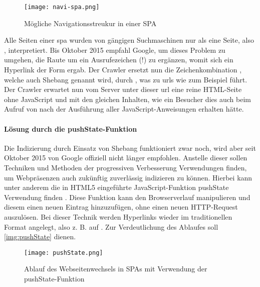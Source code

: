\begin{figure}[H]
	\begin{center}
		\texttt{[image: navi-spa.png]}
		\caption{Mögliche Navigationsstreukur in einer SPA}
		\label{img:navi-spa}
	\end{center}
\end{figure}

Alle Seiten einer \ac{spa} wurden von gängigen Suchmaschinen nur als eine Seite, also , interpretiert. Bis Oktober 2015 empfahl Google, um dieses Problem zu umgehen, die Raute um ein Ausrufezeichen (!) zu ergänzen, womit sich ein Hyperlink der Form  ergab. Der Crawler ersetzt nun die Zeichenkombination \quotes{\#!}, welche auch Shebang genannt wird, durch , was zu \ac{url}s wie zum Beispiel  führt. Der Crawler erwartet nun vom Server unter dieser \ac{url} eine reine HTML-Seite ohne JavaScript und mit den gleichen Inhalten, wie ein Besucher dies auch beim Aufruf von  nach der Ausführung aller JavaScript-Anweisungen erhalten hätte.

\paragraph{Lösung durch die pushState-Funktion}
Die Indizierung durch Einsatz von Shebang funktioniert zwar noch, wird aber seit Oktober 2015 von Google offiziell nicht länger empfohlen. Anstelle dieser sollen Techniken und Methoden der progressiven Verbesserung Verwendungen finden, um Webpräsenzen auch zukünftig zuverlässig indizieren zu können. Hierbei kann unter anderem die in HTML5 eingeführte JavaScript-Funktion pushState Verwendung finden \cite{Google2015}. Diese Funktion kann den Browserverlauf manipulieren und diesem einen neuen Eintrag hinzuzufügen, ohne einen neuen HTTP-Request auszulösen. Bei dieser Technik werden Hyperlinks wieder im traditionellen Format angelegt, also z. B. auf . Zur Verdeutlichung des Ablaufes soll \autoref{img:pushState} dienen.

\begin{figure}[H]
	\begin{center}
		\texttt{[image: pushState.png]}
		\caption{Ablauf des Webseitenwechsels in SPAs mit Verwendung der pushState-Funktion}
		\label{img:pushState}
	\end{center}
\end{figure}

